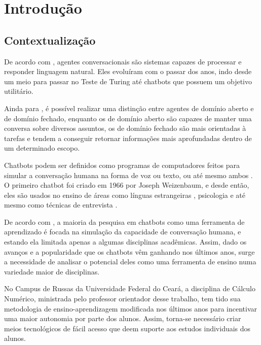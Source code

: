 \chapter{Introdução}
\label{cap:introducao}

\section{Contextualização}
\label{sec:contextualizacao}

De acordo com , agentes conversacionais são sistemas capazes de processar e responder linguagem natural. Eles evoluíram com o passar dos anos, indo desde um meio para passar no Teste de Turing até chatbots que possuem um objetivo utilitário.

Ainda para , é possível realizar uma distinção entre agentes de domínio aberto e de domínio fechado, enquanto os de domínio aberto são capazes de manter uma conversa sobre diversos assuntos, os de domínio fechado são mais orientadas à tarefas e tendem a conseguir retornar informações mais aprofundadas dentro de um determinado escopo.

Chatbots podem ser definidos como programas de computadores feitos para simular a conversação humana na forma de voz ou texto, ou até mesmo ambos . O primeiro chatbot foi criado em 1966 por Joseph Weizenbaum, e desde então, eles são usados no ensino de áreas como línguas estrangeiras , psicologia  e até mesmo como técnicas de entrevista .

De acordo com , a maioria da pesquisa em chatbots como uma ferramenta de aprendizado é focada na simulação da capacidade de conversação humana, e estando ela limitada apenas a algumas disciplinas acadêmicas. Assim, dado os avanços e a popularidade que os chatbots vêm ganhando nos últimos anos, surge a necessidade de analisar o potencial deles como uma ferramenta de ensino numa variedade maior de disciplinas.

No Campus de Russas da Universidade Federal do Ceará, a disciplina de Cálculo Numérico, ministrada pelo professor orientador desse trabalho, tem tido sua metodologia de ensino-aprendizagem modificada nos últimos anos para incentivar uma maior autonomia por parte dos alunos. Assim, torna-se necessário criar meios tecnológicos de fácil acesso que deem suporte aos estudos individuais dos alunos.

